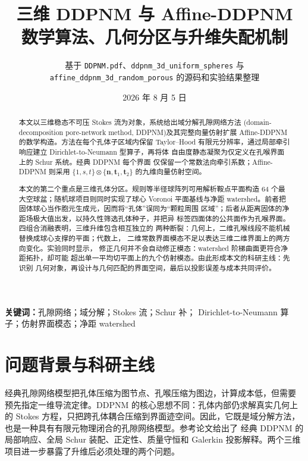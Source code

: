 \documentclass[UTF8,zihao=-4]{ctexart}
\title{\bfseries\LARGE 三维 DDPNM 与 Affine-DDPNM\\[0.5em]
\Large 数学算法、几何分区与升维失配机制}
\author{基于 \texttt{DDPNM.pdf}、\texttt{ddpnm\_3d\_uniform\_spheres} 与\\
\texttt{affine\_ddpnm\_3d\_random\_porous} 的源码和实验结果整理}
\date{2026 年 8 月 5 日}
\begin{document}
\maketitle

\begin{abstract}
本文以三维稳态不可压 Stokes 流为对象，系统给出域分解孔隙网络方法
(domain-decomposition pore-network method, DDPNM)及其完整向量仿射扩展
Affine-DDPNM 的数学构造。方法在每个孔体子区域内保留 Taylor--Hood
有限元分辨率，通过局部牵引响应建立 Dirichlet-to-Neumann 型算子，再将体
自由度静态凝聚为仅定义在孔喉界面上的 Schur 系统。经典 DDPNM 每个界面
仅保留一个常数法向牵引系数；Affine-DDPNM 则采用
$\{1,s,t\}\otimes\{\bm n,\bm t_1,\bm t_2\}$ 的九维向量仿射空间。

本文的第二个重点是三维孔体分区。规则等半径球阵列可用解析鞍点平面构造
64 个最大空球盆；随机球项目则同时实现了球心 Voronoi 平面基线与净距
watershed。前者把固体球心当作胞元生成元，因而将``孔体''误同为``颗粒周围
区域''；后者从距离固体的净距场极大值出发，以持久性筛选孔体种子，并把异
标签四面体的公共面作为孔喉界面。四组合消融表明，三维升维包含相互独立的
两种断裂：几何上，二维孔喉线段不能机械替换成球心支撑的平面；代数上，
二维常数界面模态不足以表达三维二维界面上的两方向变化。实验同时显示，
修正几何并不会自动修正模态：watershed 阶梯曲面更符合净距拓扑，却可能
超出单一平均切平面上的九个仿射模态。由此形成本文的科研主线：先识别
几何对象，再设计与几何匹配的界面空间，最后以投影误差与成本共同评价。
\end{abstract}

\noindent\textbf{关键词：}孔隙网络；域分解；Stokes 流；Schur 补；
Dirichlet-to-Neumann 算子；仿射界面模态；净距 watershed

\clearpage
{\footnotesize\tableofcontents}
\clearpage

\section{问题背景与科研主线}

经典孔隙网络模型把孔体压缩为图节点、孔喉压缩为图边，计算成本低，但需要
预先指定一维导流定律。DDPNM 的核心思想不同：孔体内部仍求解真实几何上的
Stokes 方程，只把跨孔体耦合压缩到界面迹空间。因此，它既是域分解方法，
也是一种具有有限元物理闭合的孔隙网络模型。参考论文\cite{Sun2026}给出了
经典 DDPNM 的局部响应、全局 Schur 装配、正定性、质量守恒和 Galerkin
投影解释。两个三维项目进一步暴露了升维后必须处理的两个问题。
\end{document}

